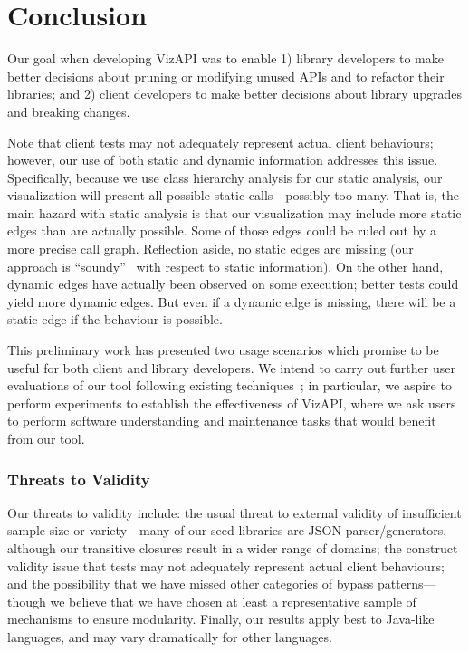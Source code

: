 \chapter{Conclusion}
Our goal when developing VizAPI was to enable 1) library developers to make better
decisions about pruning or modifying unused APIs and to refactor their
libraries; and 2) client developers to make better decisions about library
upgrades and breaking changes.


Note that client tests may
not adequately represent actual client behaviours; however, our use of both static
and dynamic information addresses this issue. Specifically, because we use
class hierarchy analysis for our static analysis, our visualization will present
all possible static calls---possibly too many. 
That is, the main hazard with static analysis is that our visualization may include more
static edges than are actually possible. Some of those edges could be ruled out by a more
precise call graph. Reflection aside, no static edges
are missing (our approach is ``soundy''~\cite{livshits15:_in_defen_sound} with respect to static information). On the other hand, dynamic edges have actually been observed
on some execution; better tests could yield more dynamic edges. But even if
a dynamic edge is missing, there will be a static edge if the behaviour is possible.

This preliminary work has presented two usage scenarios which promise to be useful for both client and library
developers. We intend to carry out further user evaluations of our tool following
existing techniques~\cite{merino18:_system_liter_review_softw_visual_evaluat}; in
particular, we aspire to perform experiments to establish the
effectiveness of VizAPI, where we ask users to perform software
understanding and maintenance tasks that would benefit from our tool.


\subsection{Threats to Validity}
Our threats to validity include: the usual threat to external validity
of insufficient sample size or variety---many of our seed libraries
are JSON parser/generators, although our transitive closures result in
a wider range of domains; the construct validity issue that tests may
not adequately represent actual client behaviours; and the possibility
that we have missed other categories of bypass patterns---though we believe
that we have chosen at least a representative sample of mechanisms to ensure
modularity. Finally, our results apply best to Java-like languages, and
may vary dramatically for other languages.

